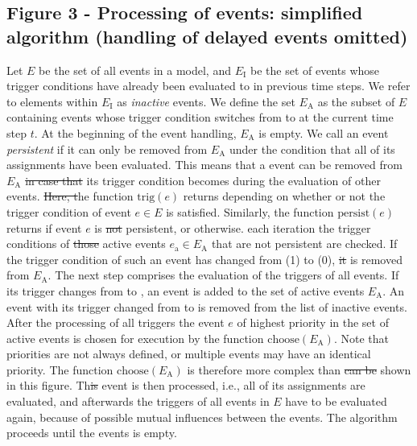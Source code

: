 \documentclass[10pt]{bmc_article}
\newenvironment{bmcformat}{\begin{raggedright}\baselineskip20pt\sloppy\setboolean{publ}{false}}{\end{raggedright}\baselineskip20pt\sloppy}
\begin{document}
\begin{bmcformat}
\subsection*{Figure 3 - Processing of events: simplified algorithm (handling of delayed events omitted)}
Let $E$ be the set of all events in a model, and $E_\mathrm{I}$ be the set of events whose trigger conditions have already been evaluated to \true in previous time steps. 
We refer to elements within $E_\mathrm{I}$ as \emph{inactive} events.
We define the set $E_\mathrm{A}$ as the subset of $E$ containing events whose trigger condition switches from \false to \true at the current time step $t$.
At the beginning of the event handling, $E_\mathrm{A}$ is empty.
We call an event \emph{persistent}\COR{,} if it can only be removed from $E_\mathrm{A}$ under the condition that all of its assignments have been evaluated.
This means that a  event can be removed from $E_\mathrm{A}$ \sout{in case that} its trigger condition becomes \false during the evaluation of other events.
\sout{Here, t}he function $\mathrm{trig}(e)$ returns  depending on whether or not the trigger condition of event $e \in E$ is satisfied.
Similarly, the function $\mathrm{persist}(e)$ returns  if event $e$ is \sout{not} persistent, or  otherwise.
 each iteration\COR{,} the trigger conditions of \sout{those} active events $e_\mathrm{a} \in E_\mathrm{A}$ that are not persistent are checked.
If the trigger condition of such an event has changed from \true (1) to \false (0), \sout{it} is removed from $E_\mathrm{A}$.
The next step comprises the evaluation of the triggers of all events.
If its trigger changes from \false to \true, an event is added to the set of active events $E_\mathrm{A}$.
An event with its trigger changed from \true to \false is removed from the list of inactive events.
After the processing of all triggers\COR{,} the event $e$ of highest priority in the set of active events is chosen for execution by the function $\mathrm{choose}(E_\mathrm{A})$.
Note that priorities are not always defined, or multiple events may have an identical priority.
The function $\mathrm{choose}(E_\mathrm{A})$ is therefore more complex than \sout{can be} shown in this figure.
Th\sout{is} event is then processed, i.e., all of its assignments are evaluated, and afterwards the triggers of all events in $E$ have to be evaluated again, because of possible mutual influences between the events.
The algorithm proceeds until the  events is empty.


\end{bmcformat}
\end{document}
